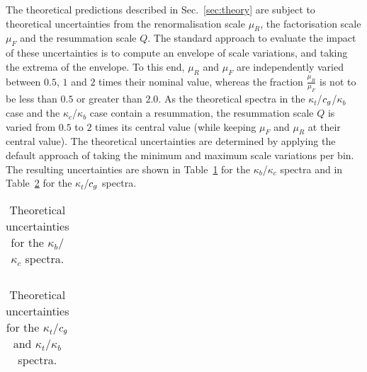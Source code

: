 The theoretical predictions described in Sec.~\ref{sec:theory} are subject to theoretical uncertainties from the renormalisation scale $\mu_R$, the factorisation scale $\mu_F$ and the resummation scale $Q$.
% 
The standard approach to evaluate the impact of these uncertainties is to compute an envelope of scale variations, and taking the extrema of the envelope.
% 
To this end, $\mu_R$ and $\mu_F$ are independently varied between $0.5$, $1$ and $2$ times their nominal value, whereas the fraction $\frac{\mu_R}{\mu_F}$ is not to be less than $0.5$ or greater than $2.0$.
% 
As the theoretical spectra in the $\kappa_t$/$c_g$/$\kappa_b$ case and the $\kappa_c$/$\kappa_b$ case contain a resummation, the resummation scale $Q$ is varied from $0.5$ to $2$ times its central value (while keeping $\mu_F$ and $\mu_R$ at their central value).
% 
The theoretical uncertainties are determined by applying the default approach of taking the minimum and maximum scale variations per bin.
% 
The resulting uncertainties are shown in Table~\ref{tab:TheoryUncertainties_kappab_kappac} for the $\kappa_b$/$\kappa_c$ spectra and in Table~\ref{tab:TheoryUncertainties_kappat_kappag} for the $\kappa_t$/$c_g$ spectra.
% 

\begin{table}[htb]
\footnotesize
\begin{center}
\begin{tabular}{lccccc}
\hline

\hline
\end{tabular}
\end{center}
\caption{
    Theoretical uncertainties for the $\kappa_b$/$\kappa_c$ spectra.
    }
\label{tab:TheoryUncertainties_kappab_kappac}
\end{table}

\begin{table}[htb]
\footnotesize
\begin{center}
\setlength{\tabcolsep}{2pt}
\begin{tabular}{lccccccccc}
\hline

\hline
\end{tabular}
\end{center}
\caption{
    Theoretical uncertainties for the $\kappa_t$/$c_g$ and $\kappa_t$/$\kappa_b$ spectra.
    }
\label{tab:TheoryUncertainties_kappat_kappag}
\end{table}



